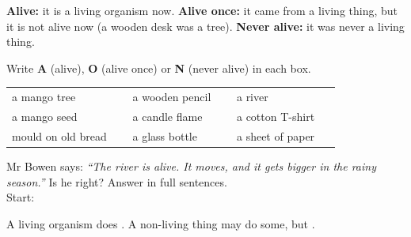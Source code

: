 \documentclass[12pt,a4paper]{article}
\newcommand{\nbox}{\ \fbox{\rule{0pt}{1.05em}\rule{1.0em}{0pt}}\ }
\newcommand{\qlines}[1]{\par\nobreak
  \noindent\begin{minipage}{\linewidth}\wlines{#1}\end{minipage}\par}
\begin{document}

\noindent\begin{minipage}{\textwidth}
\begin{wordhelp}
  \textbf{Alive:} it is a living organism now. \quad \textbf{Alive once:} it came from
  a living thing, but it is not alive now (a wooden desk was a tree). \quad
  \textbf{Never alive:} it was never a living thing.
\end{wordhelp}

\noindent Write \textbf{A} (alive), \textbf{O} (alive once) or \textbf{N} (never alive)
in each box.

\vspace{4pt}
{\renewcommand{\arraystretch}{1.85}%
\noindent\begin{tabularx}{\textwidth}{@{}L L L@{}}
  a mango tree \nbox & a wooden pencil \nbox & a river \nbox \\
  a mango seed \nbox & a candle flame \nbox & a cotton T-shirt \nbox \\
  mould on old bread \nbox & a glass bottle \nbox & a sheet of paper \nbox \\
\end{tabularx}}
\end{minipage}

\vspace{8pt}
\noindent\begin{minipage}{\textwidth}
\noindent Mr Bowen says: \emph{``The river is alive. It moves, and it gets bigger in the
rainy season.''} Is he right? Answer in full sentences. \\[3pt]
Start: 
\qlines{2}
\end{minipage}


\begin{remember}
  A living organism does . A non-living thing may do some, but
  .
\end{remember}
\end{document}
